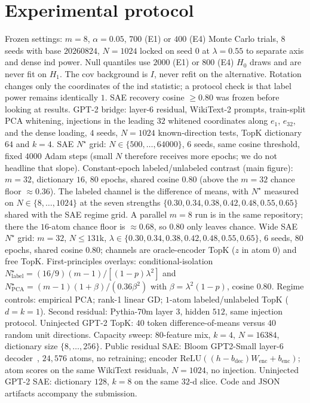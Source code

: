 \documentclass{article}
\theoremstyle{plain}
\begin{document}
{\section{Experimental protocol}
\label{app:exp}
Frozen settings: $m=8$, $\alpha=0.05$, $700$ (E1) or $400$ (E4) Monte Carlo trials, $8$ seeds with base $20260824$, $N=1024$ locked on seed $0$ at $\lambda=0.55$ to separate axis and dense ind power. Null quantiles use $2000$ (E1) or $800$ (E4) $H_0$ draws and are never fit on $H_1$. The cov background is $I$, never refit on the alternative. Rotation changes only the coordinates of the ind statistic; a protocol check is that label power remains identically $1$. SAE recovery cosine $\ge 0.80$ was frozen before looking at results. GPT-2 bridge: layer-$6$ residual, WikiText-2 prompts, train-split PCA whitening, injections in the leading $32$ whitened coordinates along $e_1$, $e_{32}$, and the dense loading, $4$ seeds, $N=1024$ known-direction tests, TopK dictionary $64$ and $k=4$. SAE $N^\star$ grid: $N\in\{500,\ldots,64000\}$, $6$ seeds, same cosine threshold, fixed $4000$ Adam steps (small $N$ therefore receives more epochs; we do not headline that slope). Constant-epoch labeled/unlabeled contrast (main figure): $m=32$, dictionary $16$, $80$ epochs, shared cosine $0.80$ (above the $m=32$ chance floor $\approx 0.36$). The labeled channel is the difference of means, with $N^\star$ measured on $N\in\{8,\ldots,1024\}$ at the seven strengths $\{0.30,0.34,0.38,0.42,0.48,0.55,0.65\}$ shared with the SAE regime grid. A parallel $m=8$ run is in the same repository; there the $16$-atom chance floor is $\approx 0.68$, so $0.80$ only leaves chance. Wide SAE $N^\star$ grid: $m=32$, $N\le 131\mathrm{k}$, $\lambda\in\{0.30,0.34,0.38,0.42,0.48,0.55,0.65\}$, $6$ seeds, $80$ epochs, shared cosine $0.80$; channels are oracle-encoder TopK ($z$ in atom $0$) and free TopK. First-principles overlays: conditional-isolation $N_{\mathrm{label}}^\star=(16/9)(m-1)/[(1-p)\lambda^2]$ and $N_{\mathrm{PCA}}^\star=(m-1)(1+\beta)/(0.36\beta^2)$ with $\beta=\lambda^2(1-p)$, cosine $0.80$. Regime controls: empirical PCA; rank-1 linear GD; $1$-atom labeled/unlabeled TopK ($d{=}k{=}1$). Second residual: Pythia-70m layer $3$, hidden $512$, same injection protocol. Uninjected GPT-2 TopK: $40$ token difference-of-means versus $40$ random unit directions. Capacity sweep: $80$-feature mix, $k=4$, $N=16384$, dictionary size $\{8,\ldots,256\}$. Public residual SAE: Bloom GPT2-Small layer-$6$ decoder~\citep{bloom2024gpt2sae}, $24{,}576$ atoms, no retraining; encoder $\mathrm{ReLU}((h-b_{\mathrm{dec}})W_{\mathrm{enc}}+b_{\mathrm{enc}})$; atom scores on the same WikiText residuals, $N=1024$, no injection. Uninjected GPT-2 SAE: dictionary $128$, $k=8$ on the same $32$-d slice. Code and JSON artifacts accompany the submission.

}
\end{document}
